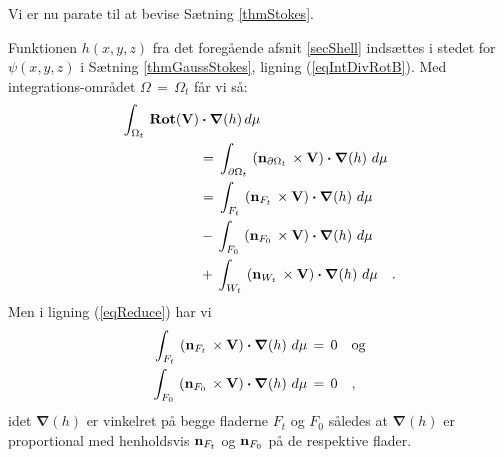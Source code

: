 Vi er nu parate til at bevise Sætning
\ref{thmStokes}.
\begin{bevis}
Funktionen  $h(x,y,z)$ fra det foregående afsnit
\ref{secShell} indsættes i stedet for
$\psi(x,y,z)$ i Sætning \ref{thmGaussStokes},
ligning (\ref{eqIntDivRotB}). Med
integrations-området $\Omega \, = \, \Omega_{t}$
får vi så:
\begin{equation} \label{eqReduce}
\begin{aligned}
\int_{\Omega_{t}}\,
\operatorname{\mathbf{Rot}}({\bf{V}})&\bm{\cdot}\bm{\nabla}(h)\, d\mu \,\\ &= \,
\int_{\partial \Omega_{t}}\,
\left({\bf{n}}_{\partial \Omega_{t}}\, \times
{\bf{V}}\right) \bm{\cdot} \bm{\nabla}(h)
 \, \,d\mu  \\ &= \,
\int_{F_{t}}\,  \left({\bf{n}}_{F_{t}}\, \times
{\bf{V}}\right) \bm{\cdot} \bm{\nabla}(h)
 \, \,d\mu \, \\ &  - \,
 \int_{F_{0}}\,  \left({\bf{n}}_{F_{0}}\,
\times {\bf{V}}\right) \bm{\cdot} \bm{\nabla}(h)
 \, \,d\mu \, \\ &  + \,
 \int_{W_{t}}\,  \left({\bf{n}}_{W_{t}}\,
\times {\bf{V}}\right) \bm{\cdot} \bm{\nabla}(h)
 \, \,d\mu
\quad .
\end{aligned}
\end{equation}
Men i ligning (\ref{eqReduce}) har vi
\begin{equation}
\begin{aligned}
\int_{F_{t}}\,  \left({\bf{n}}_{F_{t}}\, \times
{\bf{V}}\right) \bm{\cdot} \bm{\nabla}(h)
 \, \,d\mu\,  &= \, 0 \quad \textrm{og} \\
 \int_{F_{0}}\,  \left({\bf{n}}_{F_{0}}\,
\times {\bf{V}}\right) \bm{\cdot} \bm{\nabla}(h)
 \, \,d\mu \, &= \, 0 \quad,
\end{aligned}
\end{equation}
idet $\bm{\nabla}(h)$ er vinkelret på  begge fladerne
$F_{t}$ og $F_{0}$ således at  $\bm{\nabla}(h)$ er
proportional med henholdsvis ${\bf{n}}_{F_{t}}$
og
${\bf{n}}_{F_{0}}$ på de respektive flader.\\






\end{bevis}
